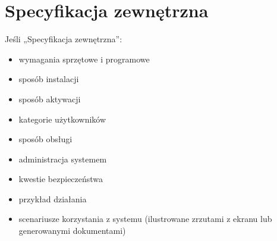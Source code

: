 \documentclass[a4paper,twoside,12pt]{book}
\begin{document}
\chapter{Specyfikacja zewnętrzna}
\label{ch:04}

Jeśli „Specyfikacja zewnętrzna”:
\begin{itemize}
\item  wymagania sprzętowe i programowe
\item  sposób instalacji
\item  sposób aktywacji
\item  kategorie użytkowników
\item  sposób obsługi
\item  administracja systemem
\item  kwestie bezpieczeństwa
\item  przykład działania
\item  scenariusze korzystania z systemu (ilustrowane zrzutami z ekranu lub generowanymi dokumentami)
\end{itemize}

%
%
%
%
%        
\end{document}
